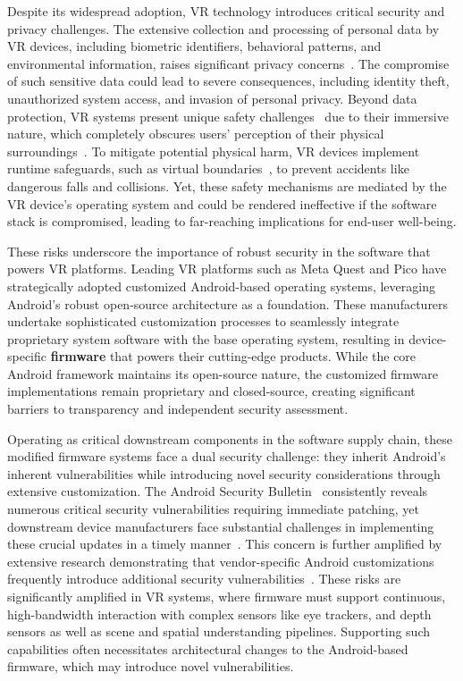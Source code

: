 \documentclass[sigconf]{acmart}
\begin{document}
Despite its widespread adoption, VR technology introduces critical security and privacy challenges. The extensive collection and processing of personal data by VR devices, including biometric identifiers, behavioral patterns, and environmental information, raises significant privacy concerns~\cite{vr-privacy-1,vr-privacy-2,vr-privacy-4}. The compromise of such sensitive data could lead to severe consequences, including identity theft, unauthorized system access, and invasion of personal privacy. Beyond data protection, VR systems present unique safety challenges~\cite{vr-safety-1,vr-safety-2} due to their immersive nature, which completely obscures users' perception of their physical surroundings~\cite{cheng2023exploring}.
To mitigate potential physical harm, VR devices implement runtime safeguards, such as virtual boundaries~\cite{guardian}, to prevent accidents like dangerous falls and collisions.
Yet, these safety mechanisms are mediated by the VR device's operating system and could be rendered ineffective if the software stack is compromised, leading to far-reaching implications for end-user well-being.


These risks underscore the importance of robust security in the software that powers VR platforms.
Leading VR platforms such as Meta Quest and Pico
have strategically adopted customized Android-based operating systems, leveraging Android's robust open-source architecture as a foundation.
These manufacturers undertake sophisticated customization processes to seamlessly integrate proprietary system software with the base operating system, resulting in device-specific {\bf firmware} that powers their cutting-edge products. While the core Android framework maintains its open-source nature, the customized firmware implementations remain proprietary and closed-source, creating significant barriers to transparency and independent security assessment.

Operating as critical downstream components in the {software supply chain}, these modified firmware systems face a dual security challenge: they inherit Android's inherent vulnerabilities while introducing novel security considerations through extensive customization. The Android Security Bulletin~\cite{android-security-bulletin} consistently reveals numerous critical security vulnerabilities requiring immediate patching, yet downstream device manufacturers face substantial challenges in implementing these crucial updates in a timely manner~\cite{zhang2018precise,zhang2021investigation}. This concern is further amplified by extensive research demonstrating that vendor-specific Android customizations frequently introduce additional security vulnerabilities~\cite{wu2013impact,zhou2014peril,aafer2016harvesting,yu2021sepal,possemato2021trust,el2021dissecting,liu2022customized,jin2023dependency}.
These risks are significantly amplified in VR systems, where firmware must support continuous, high-bandwidth interaction with complex sensors like eye trackers, and depth sensors as well as scene and spatial understanding pipelines.
Supporting such capabilities often necessitates architectural changes to the Android-based firmware, which may introduce novel vulnerabilities.
\end{document}
